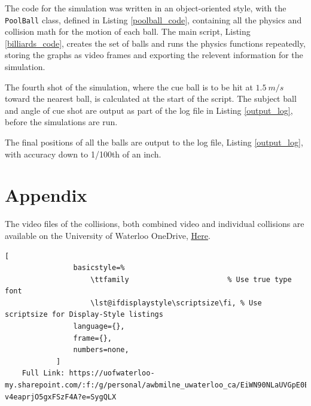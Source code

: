 \documentclass[12pt]{article}
\begin{document}
The code for the simulation was written in an object-oriented style, with the \lstinline{PoolBall} class, defined in Listing \ref{poolball_code}, containing all the physics and collision math for the motion of each ball. The main script, Listing \ref{billiards_code}, creates the set of balls and runs the physics functions repeatedly, storing the graphs as video frames and exporting the relevent information for the simulation.

The fourth shot of the simulation, where the cue ball is to be hit at $1.5 \ m/s$ toward the nearest ball, is calculated at the start of the script. The subject ball and angle of cue shot are output as part of the log file in Listing \ref{output_log}, before the simulations are run.

The final positions of all the balls are output to the log file, Listing \ref{output_log}, with accuracy down to 1/100th of an inch.

\pagebreak
\section{Appendix}

{
    The video files of the collisions, both combined video and individual collisions are available on the University of Waterloo OneDrive, \href{https://uofwaterloo-my.sharepoint.com/:f:/g/personal/awbmilne_uwaterloo_ca/EiWN90NLaUVGpE0EcLgVf8wBgqZj-v4eaprjO5gxFSzF4A?e=SygQLX}{\underline{Here}}.

    \vspace{0.1cm}
    
    \begin{lstlisting}[
                basicstyle=%
                    \ttfamily                       % Use true type font
                    \lst@ifdisplaystyle\scriptsize\fi, % Use scriptsize for Display-Style listings
                language={},
                frame={},
                numbers=none,
            ]
    Full Link: https://uofwaterloo-my.sharepoint.com/:f:/g/personal/awbmilne_uwaterloo_ca/EiWN90NLaUVGpE0EcLgVf8wBgqZj-v4eaprjO5gxFSzF4A?e=SygQLX
    \end{lstlisting}
}


\vspace{5cm}

\end{document}
